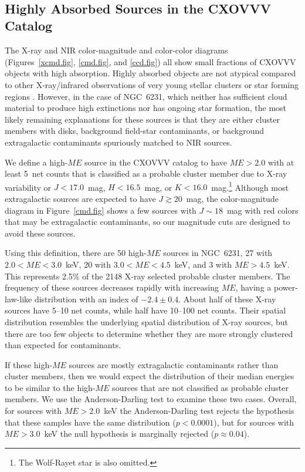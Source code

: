 \documentclass[twocolumn,tighten]{aastex61}
\begin{document}
~~~
~~~
~~~
\subsection{Highly Absorbed Sources in the CXOVVV Catalog \label{hard.sec}}

The X-ray and NIR color-magnitude and color-color diagrams (Figures~\ref{xcmd.fig}, \ref{cmd.fig}, and \ref{ccd.fig}) all show small fractions of CXOVVV objects with high absorption. Highly absorbed objects are not atypical compared to other X-ray/infrared observations of very young stellar clusters or star forming regions \citep[see the X-ray ``color-magnitude diagrams'' in Figure~6 of][]{2013ApJS..209...27K}. However, in the case of NGC~6231, which neither  has sufficient cloud material to produce high extinctions nor has ongoing star formation, the most likely remaining explanations for these sources is that they are either cluster members with disks, background field-star contaminants, or background extragalactic contaminants spuriously matched to NIR sources.



We define a high-$ME$ source in the CXOVVV catalog to have $ME>2.0$ with at least 5~net counts that is classified as a probable cluster member due to X-ray variability or $J<17.0$~mag, $H<16.5$~mag, or $K<16.0$~mag.\footnote{The Wolf-Rayet star is also omitted.} Although most extragalactic sources are expected to have $J\gtrsim20$~mag, the color-magnitude diagram in Figure~\ref{cmd.fig} shows a few sources with $J\sim18$~mag with red colors that may be extragalactic contaminants, so our magnitude cuts are designed to avoid these sources. 

Using this definition, there are 50 high-$ME$ sources in NGC~6231, 27 with $2.0<ME<3.0$~keV, 20 with $3.0<ME<4.5$~keV, and 3 with $ME>4.5$~keV.
This represents 2.5\% of the 2148 X-ray selected probable cluster members. The frequency of these sources decreases rapidly with increasing $ME$, having a power-law-like distribution with an index of $-2.4\pm0.4$. About half of these X-ray sources have 5--10 net counts, while half have 10--100 net counts. Their spatial distribution resembles the underlying spatial distribution of X-ray sources, but there are too few objects to determine whether they are more strongly clustered than expected for contaminants.

If these high-$ME$ sources are mostly extragalactic contaminants rather than cluster members, then we would expect the distribution of their median energies to be similar to the high-$ME$ sources that are not classified as probable cluster members. We use the Anderson-Darling test to examine these two cases. Overall, for sources with $ME>2.0$~keV the Anderson-Darling test rejects the hypothesis that these samples have the same distribution ($p<0.0001$), but for sources with $ME>3.0$~keV the null hypothesis is marginally rejected ($p\approx0.04$). 
\end{document}
